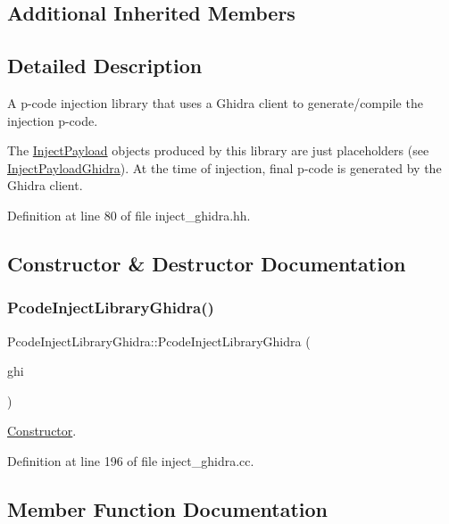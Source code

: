 \subsection*{Additional Inherited Members}


\subsection{Detailed Description}
A p-\/code injection library that uses a Ghidra client to generate/compile the injection p-\/code. 

The \mbox{\hyperlink{class_inject_payload}{Inject\+Payload}} objects produced by this library are just placeholders (see \mbox{\hyperlink{class_inject_payload_ghidra}{Inject\+Payload\+Ghidra}}). At the time of injection, final p-\/code is generated by the Ghidra client. 

Definition at line 80 of file inject\+\_\+ghidra.\+hh.



\subsection{Constructor \& Destructor Documentation}
\mbox{\label{class_pcode_inject_library_ghidra_a1a006d69d9331334be7a2e592b03cb73}} 
\subsubsection{\texorpdfstring{PcodeInjectLibraryGhidra()}{PcodeInjectLibraryGhidra()}}
{\footnotesize\ttfamily Pcode\+Inject\+Library\+Ghidra\+::\+Pcode\+Inject\+Library\+Ghidra (\begin{DoxyParamCaption}\item[{\mbox{\hyperlink{class_architecture_ghidra}{Architecture\+Ghidra}} $\ast$}]{ghi }\end{DoxyParamCaption})}



\mbox{\hyperlink{class_constructor}{Constructor}}. 



Definition at line 196 of file inject\+\_\+ghidra.\+cc.



\subsection{Member Function Documentation}
\mbox{\label{class_pcode_inject_library_ghidra_a1195225ccb9918e6ca0b62d9a932b66f}} 
